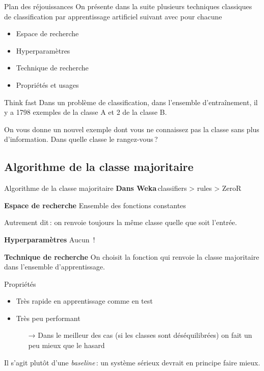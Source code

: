 \documentclass[../allslides.tex]{subfiles}
\begin{document}
\begin{frame}{Plan des réjouissances}
    On présente dans la suite plusieurs techniques classiques de classification par apprentissage artificiel suivant avec pour chacune
    \begin{itemize}
        \item Espace de recherche
        \item Hyperparamètres
        \item Technique de recherche
        \item Propriétés et usages
    \end{itemize}
\end{frame}
 
\begin{frame}{Think fast}
    Dans un problème de classification, dans l'ensemble d'entraînement, il y a \num{1798} exemples de la classe A et \num{2} de la classe B.

    On vous donne un nouvel exemple dont vous ne connaissez pas la classe sans plus d'information. Dans quelle classe le rangez-vous ?
\end{frame}


\subsection{Algorithme de la classe majoritaire}
\begin{frame}{Algorithme de la classe majoritaire}
    \textbf{Dans Weka} classifiers > rules > ZeroR

    \textbf{Espace de recherche} Ensemble des fonctions constantes

    Autrement dit : on renvoie toujours la même classe quelle que soit l'entrée.

    \textbf{Hyperparamètres} Aucun !

    \textbf{Technique de recherche} On choisit la fonction qui renvoie la classe majoritaire dans l'ensemble d'apprentissage.
\end{frame}

\begin{frame}{Propriétés}
    \begin{itemize}
        \item Très rapide en apprentissage comme en test
        \item Très peu performant
            \begin{itemize}
                \item[→] Dans le meilleur des cas (si les classes sont déséquilibrées) on fait un peu mieux que le hasard
            \end{itemize}
    \end{itemize}
    Il s'agit plutôt d'une \emph{baseline} : un système sérieux devrait en principe faire mieux.
\end{frame}
\end{document}
